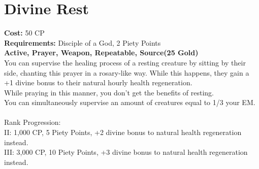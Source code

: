 \section{Divine Rest}\label{prayer:divineRest}
\textbf{Cost:} 50 CP\\
\textbf{Requirements:} Disciple of a God, 2 Piety Points \\
\textbf{Active, Prayer, Weapon, Repeatable, Source(25 Gold)}\\
You can supervise the healing process of a resting creature by sitting by their side, chanting this prayer in a rosary-like way.
While this happens, they gain a +1 divine bonus to their natural hourly health regeneration.\\
While praying in this manner, you don't get the benefits of resting.\\
You can simultaneously supervise an amount of creatures equal to 1/3 your EM.\\
\\
Rank Progression:\\
II: 1,000 CP, 5 Piety Points, +2 divine bonus to natural health regeneration instead.\\
III: 3,000 CP, 10 Piety Points, +3 divine bonus to natural health regeneration instead.\\